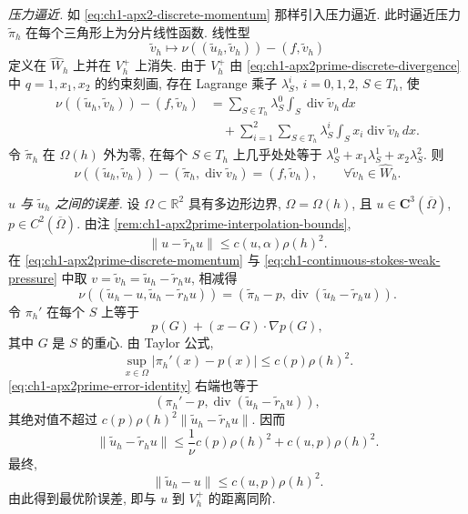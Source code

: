 \emph{压力逼近.} 如 \eqref{eq:ch1-apx2-discrete-momentum} 那样引入压力逼近. 此时逼近压力 $\widetilde\pi_h$ 在每个三角形上为分片线性函数. 线性型
\[
\widetilde v_h\longmapsto
\nu((\widetilde u_h,\widetilde v_h))-(f,\widetilde v_h)
\]
定义在 $\widehat W_h$ 上并在 $V_h^+$ 上消失. 由于 $V_h^+$ 由 \eqref{eq:ch1-apx2prime-discrete-divergence} 中 $q=1,x_1,x_2$ 的约束刻画, 存在 Lagrange 乘子 $\lambda_S^i$, $i=0,1,2$, $S\in T_h$, 使
\[
\begin{aligned}
\nu((\widetilde u_h,\widetilde v_h))-(f,\widetilde v_h)
&=\sum_{S\in T_h}\lambda_S^0\int_S\operatorname{div}\widetilde v_h\,dx\\
&\quad+\sum_{i=1}^2\sum_{S\in T_h}
\lambda_S^i\int_Sx_i\operatorname{div}\widetilde v_h\,dx.
\end{aligned}
\]
令 $\widetilde\pi_h$ 在 $\Omega(h)$ 外为零, 在每个 $S\in T_h$ 上几乎处处等于
$\lambda_S^0+x_1\lambda_S^1+x_2\lambda_S^2$. 则
\begin{equation}
\nu((\widetilde u_h,\widetilde v_h))
-(\widetilde\pi_h,\operatorname{div}\widetilde v_h)
=(f,\widetilde v_h),
\qquad\forall\widetilde v_h\in\widehat W_h.
\label{eq:ch1-apx2prime-discrete-momentum}
\end{equation}

\emph{$u$ 与 $\widetilde u_h$ 之间的误差.} 设 $\Omega\subset\mathbb R^2$ 具有多边形边界, $\Omega=\Omega(h)$, 且
$u\in\mathbf C^3(\overline\Omega)$, $p\in C^2(\overline\Omega)$. 由注 \ref{rem:ch1-apx2prime-interpolation-bounds},
\begin{equation}
\|u-\widetilde r_hu\|
\leq c(u,\alpha)\rho(h)^2.
\label{eq:ch1-apx2prime-restriction-error}
\end{equation}
在 \eqref{eq:ch1-apx2prime-discrete-momentum} 与
\eqref{eq:ch1-continuous-stokes-weak-pressure} 中取
$v=\widetilde v_h=\widetilde u_h-\widetilde r_hu$, 相减得
\begin{equation}
\nu((\widetilde u_h-u,\widetilde u_h-\widetilde r_hu))
=(\widetilde\pi_h-p,
\operatorname{div}(\widetilde u_h-\widetilde r_hu)).
\label{eq:ch1-apx2prime-error-identity}
\end{equation}
令 $\pi_h'$ 在每个 $S$ 上等于
\[
p(G)+(x-G)\cdot\nabla p(G),
\]
其中 $G$ 是 $S$ 的重心. 由 Taylor 公式,
\begin{equation}
\sup_{x\in\Omega}|\pi_h'(x)-p(x)|
\leq c(p)\rho(h)^2.
\label{eq:ch1-apx2prime-pressure-interpolation}
\end{equation}
\eqref{eq:ch1-apx2prime-error-identity} 右端也等于
\[
(\pi_h'-p,\operatorname{div}(\widetilde u_h-\widetilde r_hu)),
\]
其绝对值不超过
$c(p)\rho(h)^2\|\widetilde u_h-\widetilde r_hu\|$. 因而
\[
\|\widetilde u_h-\widetilde r_hu\|
\leq\frac1\nu c(p)\rho(h)^2+c(u,p)\rho(h)^2.
\]
最终,
\begin{equation}
\|\widetilde u_h-u\|
\leq c(u,p)\rho(h)^2.
\label{eq:ch1-apx2prime-optimal-error}
\end{equation}
由此得到最优阶误差, 即与 $u$ 到 $V_h^+$ 的距离同阶.

